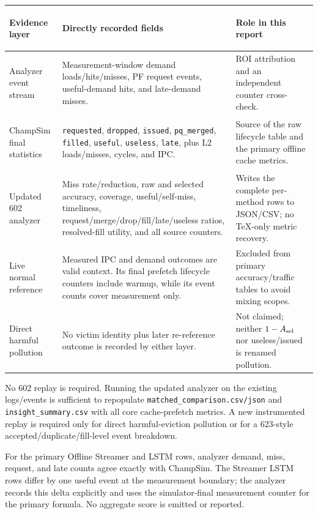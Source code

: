 \documentclass[10pt]{article}
\begin{document}
\begin{tabularx}{\textwidth}{@{}
  >{\bfseries\raggedright\arraybackslash}p{}
  >{\raggedright\arraybackslash}X
  >{\raggedright\arraybackslash}X@{}}
\toprule
Evidence layer & Directly recorded fields & Role in this report \\
\midrule
Analyzer event stream &
Measurement-window demand loads/hits/misses, PF request events,
useful-demand hits, and late-demand misses. &
ROI attribution and an independent counter cross-check.\\
ChampSim final statistics &
\texttt{requested}, \texttt{dropped}, \texttt{issued},
\texttt{pq\_merged}, \texttt{filled}, \texttt{useful},
\texttt{useless}, \texttt{late}, plus L2 loads/misses, cycles, and IPC. &
Source of the raw lifecycle table and the primary offline cache metrics.\\
Updated 602 analyzer &
Miss rate/reduction, raw and selected accuracy, coverage,
useful/self-miss, timeliness, request/merge/drop/fill/late/useless ratios,
resolved-fill utility, and all source counters. &
Writes the complete per-method rows to JSON/CSV; no TeX-only metric recovery.\\
Live normal reference &
Measured IPC and demand outcomes are valid context.  Its final prefetch
lifecycle counters include warmup, while its event counts cover measurement
only. &
Excluded from primary accuracy/traffic tables to avoid mixing scopes.\\
Direct harmful pollution &
No victim identity plus later re-reference outcome is recorded by either
layer. &
Not claimed; neither $1-A_{\rm sel}$ nor useless/issued is renamed pollution.\\
\bottomrule
\end{tabularx}

\begin{infobox}[title={\bfseries Analyze/replay decision}]
No 602 replay is required.  Running the updated analyzer on the existing
logs/events is sufficient to repopulate
\texttt{matched\_comparison.csv/json} and
\texttt{insight\_summary.csv} with all core cache-prefetch metrics.
A new instrumented replay is required only for direct harmful-eviction
pollution or for a 623-style accepted/duplicate/fill-level event breakdown.
\end{infobox}

{\footnotesize For the primary Offline Streamer and LSTM rows, analyzer demand,
miss, request, and late counts agree exactly with ChampSim.  The Streamer
LSTM rows differ by one useful event at the measurement boundary; the analyzer
records this delta explicitly and uses the simulator-final measurement counter
for the primary formula.  No aggregate score is emitted or reported.}
\end{document}
